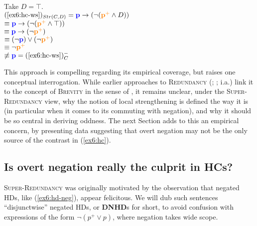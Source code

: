 \begin{exe}
{		Take $D=\top$.\\
		$(\textref{ex6:hc-ws})_{Str(C, D)} =  \p \rightarrow (\neg(\pplus \wedge D)) $\\
		 $\equiv \textbf{\textcolor{blue}{p}} \rightarrow (\neg(\textbf{\textcolor{orange}{p$^+$}} \wedge \top))$\\
		 $\equiv \textbf{\textcolor{blue}{p}} \rightarrow (\neg\textbf{\textcolor{orange}{p$^+$}})$\\
		 $\equiv (\neg\textbf{\textcolor{blue}{p}}) \vee (\neg\textbf{\textcolor{orange}{p$^+$}})$\\
		 $\equiv \neg\textbf{\textcolor{orange}{p$^+$}}$\\
		 $\not\equiv \p = (\textref{ex6:hc-ws})^-_C$\\
		
	}
\end{exe}


This approach is compelling regarding its empirical coverage, but raises one conceptual interrogation. While earlier approaches to \textsc{Redundancy} (; ;  i.a.) link it to the concept of \textsc{Brevity} in the sense of \citet{Grice1975}, it remains unclear, under the \textsc{Super-Redundancy} view, why the notion of local strengthening is defined the way it is (in particular when it comes to its commuting with negation), and why it should be so central in deriving oddness. The next Section adds to this an empirical concern, by presenting data suggesting that overt negation may not be the only source of the contrast in (\ref{ex6:hc}).



\subsection{Is overt negation really the culprit in HCs?}

\textsc{Super-Redundancy} was originally motivated by the observation that negated HDs, like (\ref{ex6:hd-neg}), appear felicitous. We will dub such sentences ``disjunctwise'' negated HDs, or \textbf{DNHD}s for short, to avoid confusion with expressions of the form $\neg (p^+ \vee p)$, where negation takes wide scope. 

\begin{exe}
	\label{ex6:hd-neg}
\end{exe}

